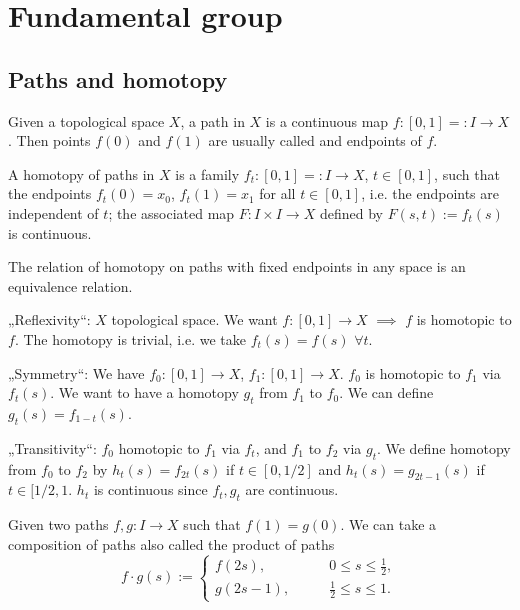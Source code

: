 \documentclass[12pt]{article}					%
\begin{document}
\section{Fundamental group}
\subsection{Paths and homotopy}
\begin{definice}
	Given a topological space $X$, a path in $X$ is a continuous map $f: [0, 1] =: I \rightarrow X$. Then points $f(0)$ and $f(1)$ are usually called and endpoints of $f$.
\end{definice}

\begin{definice}[Homotopy]
	A homotopy of paths in $X$ is a family $f_t: [0, 1] =: I \rightarrow X$, $t \in [0, 1]$, such that the endpoints $f_t(0) = x_0$, $f_t(1) = x_1$ for all $t \in [0, 1]$, i.e. the endpoints are independent of $t$; the associated map $F: I \times I \rightarrow X$ defined by $F(s, t) := f_t(s)$ is continuous.
\end{definice}

\begin{tvrzeni}
	The relation of homotopy on paths with fixed endpoints in any space is an equivalence relation.

	\begin{dukazin}
		„Reflexivity“: $X$ topological space. We want $f: [0, 1] \rightarrow X$ $\implies$ $f$ is homotopic to $f$. The homotopy is trivial, i.e. we take $f_t(s) = f(s)$ $\forall t$.

		„Symmetry“: We have $f_0: [0, 1] \rightarrow X$, $f_1: [0, 1] \rightarrow X$. $f_0$ is homotopic to $f_1$ via $f_t(s)$. We want to have a homotopy $g_t$ from $f_1$ to $f_0$. We can define $g_t(s) = f_{1 - t}(s)$.

		„Transitivity“: $f_0$ homotopic to $f_1$ via $f_t$, and $f_1$ to $f_2$ via $g_t$. We define homotopy from $f_0$ to $f_2$ by $h_t(s) = f_{2t}(s)$ if $t \in [0, 1 / 2]$ and $h_t(s) = g_{2t - 1}(s)$ if $t \in [1 / 2, 1$. $h_t$ is continuous since $f_t, g_t$ are continuous.
	\end{dukazin}
\end{tvrzeni}

\begin{definice}
	Given two paths $f, g: I \rightarrow X$ such that $f(1) = g(0)$. We can take a composition of paths also called the product of paths
	$$ f·g(s) := \begin{cases}f(2s), \qquad& 0 ≤ s ≤ \frac{1}{2},\\g(2s - 1), \qquad& \frac{1}{2} ≤ s ≤ 1.\end{cases} $$
\end{definice}
\end{document}
